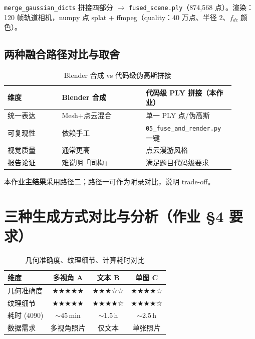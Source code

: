 \documentclass[11pt]{article}
\begin{document}
\texttt{merge\_gaussian\_dicts} 拼接四部分 $\rightarrow$ \texttt{fused\_scene.ply}（874{,}568 点）。渲染：120 帧轨道相机，numpy 点 splat + ffmpeg（quality：40 万点、半径 2、$f_{dc}$ 颜色）。

\subsection{两种融合路径对比与取舍}

\begin{table}[h]
\centering
\caption{Blender 合成 vs 代码级伪高斯拼接}
\small
\begin{tabular}{p{0.22\linewidth}p{0.34\linewidth}p{0.34\linewidth}}
\toprule
维度 & Blender 合成 & 代码级 PLY 拼接（本作业） \\
\midrule
统一表达 & Mesh+点云混合 & 单一 PLY 点/伪高斯 \\
可复现性 & 依赖手工 & \texttt{05\_fuse\_and\_render.py} 一键 \\
视觉质量 & 通常更高 & 点云漫游风格 \\
报告论证 & 难说明「同构」 & 满足题目代码级要求 \\
\bottomrule
\end{tabular}
\end{table}

本作业\textbf{主结果}采用路径二；路径一可作为附录对比，说明 trade-off。

\section{三种生成方式对比与分析（作业 §4 要求）}

\begin{table}[h]
\centering
\caption{几何准确度、纹理细节、计算耗时对比}
\begin{tabular}{lccc}
\toprule
维度 & 多视角 A & 文本 B & 单图 C \\
\midrule
几何准确度 & ★★★★★ & ★★★☆☆ & ★★★★☆ \\
纹理细节 & ★★★★★ & ★★★★☆ & ★★★★☆ \\
耗时 (4090) & $\sim$45\,min & $\sim$1.5\,h & $\sim$2.5\,h \\
数据需求 & 多视角照片 & 仅文本 & 单张照片 \\
\bottomrule
\end{tabular}
\end{table}
\end{document}
